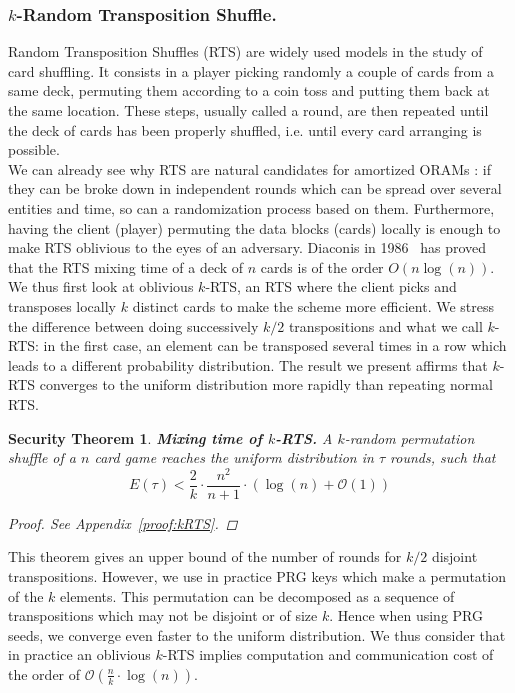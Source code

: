 \documentclass[USenglish,oneside,twocolumn]{article}
\newtheorem{secthm}{Security Theorem}
\begin{document}
%
\subsubsection{$k$-Random Transposition Shuffle.}\label{kRTS}
Random Transposition Shuffles (RTS) are widely used models in the study of card shuffling. It consists in a player picking randomly a couple of cards from a same deck, permuting them according to a coin toss and putting them back at the same location.
These steps, usually called a round, are then repeated until the deck of cards has been properly shuffled, i.e. until every card arranging is possible.\\
We can already see why RTS are natural candidates for amortized ORAMs : if they can be broke down in independent rounds which can be spread over several entities and time, so can a randomization process based on them. Furthermore, having the client (player) permuting the data blocks (cards) locally is enough to make RTS oblivious to the eyes of an adversary.
Diaconis in 1986~\cite{aldous1986shuffling} has proved that the RTS mixing time of a deck of $n$ cards is of the order  $O\left(n\log(n)\right)$. We thus first look at oblivious $k$-RTS, an RTS where the client picks and transposes locally $k$ distinct cards to make the scheme more efficient. We stress the difference between doing successively $k/2$ transpositions and what we call $k$-RTS: in the first case, an element can be transposed several times in a row which leads to a different probability distribution. The result we present affirms that  $k$-RTS converges to the uniform distribution more rapidly than repeating normal RTS.  

\begin{secthm}
\textbf{Mixing time of $k$-RTS.} A $k$-random permutation shuffle of a $n$ card game reaches the uniform distribution in $\tau$ rounds, such that
$$E(\tau) < \frac{2}{k}\cdot\frac{n^2}{n+1}\cdot \left ( \log(n) + \mathcal{O}(1) \right ) $$
\begin{proof}
See Appendix~\ref{proof:kRTS}.
\end{proof}
\end{secthm}

This theorem gives an upper bound of the number of rounds for $k/2$ disjoint transpositions. However, we use in practice PRG keys which make a permutation of the $k$ elements. This permutation can be decomposed as a sequence of transpositions which may not be disjoint or of size $k$. Hence when using PRG seeds, we converge even faster to the uniform distribution. We thus consider that in practice an oblivious $k$-RTS implies computation and communication cost of the order of $\mathcal{O} \left(\frac{n}{k}\cdot \log(n)\right)$.
\end{document}
